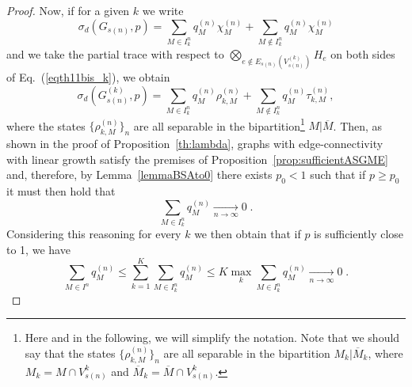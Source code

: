 \documentclass[a4paper,onecolumn,accepted=2024-12-14]{quantumarticle}
\theoremstyle{plain}
\begin{document}
\begin{proof}
Now, if for a given $k$ we write
\begin{equation}\label{eqth11bis_k}
\sigma_d(G_{s(n)},p)=\sum_{M\in I_k^n}q_M^{(n)}\chi_M^{(n)}+\sum_{M\notin I_k^n}q_M^{(n)}\chi_M^{(n)}
\end{equation}and we take the partial trace with respect to
$\bigotimes_{e\notin E_{s(n)}(V_{s(n)}^{(k)})}H_e$ on both sides of Eq.~(\ref{eqth11bis_k}), we obtain
\begin{equation}%
\sigma_d(G_{s(n)}^{(k)},p)=\sum_{M\in I_k^n}q_M^{(n)}\rho_{k,M}^{(n)}+\sum_{M\notin I_k^n}q_M^{(n)}\tau_{k,M}^{(n)},
\end{equation}
where the states $\{\rho_{k,M}^{(n)}\}_n$ are all separable in the bipartition\footnote{Here and in the following, we will simplify the notation. Note that we should say that the states $\{\rho_{k,M}^{(n)}\}_n$ are all separable in the bipartition $M_k|\overline{M}_k$, where $M_k=M\cap V_{s(n)}^k$ and $\overline{M}_k=\overline{M}\cap V_{s(n)}^k$.} $M|\overline{M}$. Then, as shown in the proof of Proposition~\ref{th:lambda}, graphs with edge-connectivity with linear growth satisfy the premises of Proposition~\ref{prop:sufficientASGME} and, therefore, by
Lemma~\ref{lemmaBSAto0} there exists $p_0<1$ such that if $p\geq p_0$ it must then hold that
\begin{equation}%
\sum_{M\in I_k^n}q_M^{(n)}\xrightarrow[n\to\infty]{} 0\;.
\end{equation}
Considering this reasoning for every $k$ we then obtain that if $p$ is sufficiently close to 1, we have
\begin{equation}\label{argu1}
\sum_{M\in I^n}q_M^{(n)}\leq\sum_{k=1}^{K}\sum_{M\in I^n_k}q_M^{(n)}\leq K\max_k\sum_{M\in I^n_k}q_M^{(n)} \xrightarrow[n\to\infty]{} 0\;.
\end{equation}


\end{proof}
\end{document}
